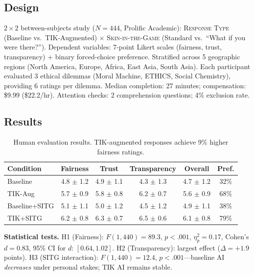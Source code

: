 \documentclass[11pt]{article}
\begin{document}
\subsection{Design}

$2 \times 2$ between-subjects study ($N\!=\!444$, Prolific Academic): \textsc{Response Type} (Baseline vs.\ TIK-Augmented) $\times$ \textsc{Skin-in-the-Game} (Standard vs.\ ``What if you were there?''). Dependent variables: 7-point Likert scales (fairness, trust, transparency) + binary forced-choice preference. Stratified across 5 geographic regions (North America, Europe, Africa, East Asia, South Asia). Each participant evaluated 3 ethical dilemmas (Moral Machine, ETHICS, Social Chemistry), providing 6 ratings per dilemma. Median completion: 27 minutes; compensation: \$9.99 (\$22.2/hr). Attention checks: 2 comprehension questions; 4\% exclusion rate.

\subsection{Results}

\begin{table}[h]
\centering
\small
\caption{Human evaluation results. TIK-augmented responses achieve 9\% higher fairness ratings.}
\label{tab:human-results}
\begin{tabular}{lccccc}
\toprule
\textbf{Condition} & \textbf{Fairness} & \textbf{Trust} & \textbf{Transparency} & \textbf{Overall} & \textbf{Pref.} \\
\midrule
Baseline & 4.8 $\pm$ 1.2 & 4.9 $\pm$ 1.1 & 4.3 $\pm$ 1.3 & 4.7 $\pm$ 1.2 & 32\% \\
TIK-Aug & 5.7 $\pm$ 0.9 & 5.8 $\pm$ 0.8 & 6.2 $\pm$ 0.7 & 5.6 $\pm$ 0.9 & 68\% \\
Baseline+SITG & 5.1 $\pm$ 1.1 & 5.0 $\pm$ 1.2 & 4.5 $\pm$ 1.2 & 4.9 $\pm$ 1.1 & 38\% \\
TIK+SITG & 6.2 $\pm$ 0.8 & 6.3 $\pm$ 0.7 & 6.5 $\pm$ 0.6 & 6.1 $\pm$ 0.8 & 79\% \\
\bottomrule
\end{tabular}
\end{table}

\textbf{Statistical tests.} H1 (Fairness): $F(1, 440) = 89.3$, $p < .001$, $\eta_p^2 = 0.17$, Cohen's $d = 0.83$, 95\% CI for $d$: $[0.64, 1.02]$. H2 (Transparency): largest effect ($\Delta = +1.9$ points). H3 (SITG interaction): $F(1, 440) = 12.4$, $p < .001$---baseline AI \textit{decreases} under personal stakes; TIK AI remains stable.
\end{document}

